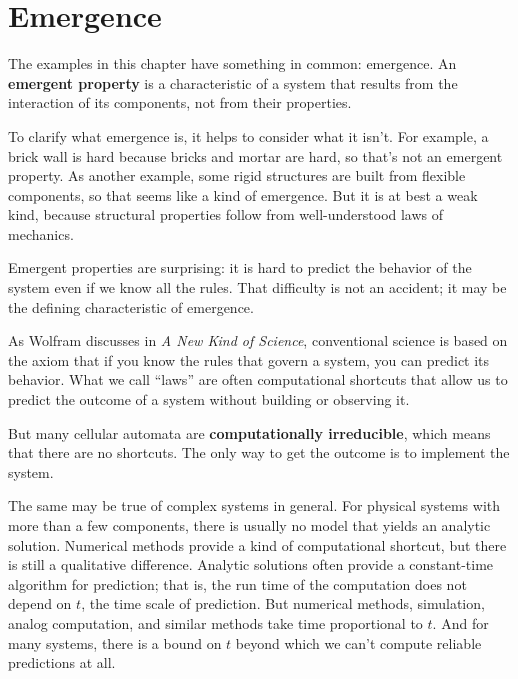 \documentclass[10pt]{book}
\begin{document}
\section{Emergence}

The examples in this chapter have something in common: emergence.  An
{\bf emergent property} is a characteristic of a system that results
from the interaction of its components, not from their properties.

To clarify what emergence is, it helps to consider what it isn't.  For
example, a brick wall is hard because bricks and mortar are hard, so
that's not an emergent property.  As another example, some rigid
structures are built from flexible components, so that seems like a
kind of emergence.  But it is at best a weak kind, because structural
properties follow from well-understood laws of mechanics.

Emergent properties are surprising: it is hard to predict the behavior
of the system even if we know all the rules.  That difficulty is not
an accident; it may be the defining characteristic of emergence.

As Wolfram discusses in {\em A New Kind of Science}, conventional science
is based on the axiom that if you know the rules that govern a system,
you can predict its behavior.  What we call ``laws'' are often
computational shortcuts that allow us to predict the outcome of a
system without building or observing it.

But many cellular automata are {\bf computationally irreducible},
which means that there are no shortcuts.  The only way to get the
outcome is to implement the system.

The same may be true of complex systems in general.  For physical
systems with more than a few components, there is usually no model
that yields an analytic solution.  Numerical methods provide a kind of
computational shortcut, but there is still a qualitative difference.
Analytic solutions often provide a constant-time algorithm for
prediction; that is, the run time of the computation does not depend
on $t$, the time scale of prediction.  But numerical methods,
simulation, analog computation, and similar methods take time
proportional to $t$.  And for many systems, there is a bound on $t$
beyond which we can't compute reliable predictions at all.
\end{document}

